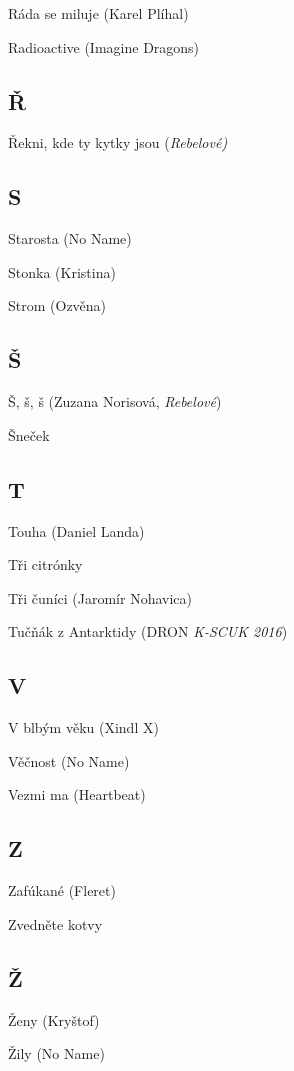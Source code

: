 \begin{multicols}{2}
Ráda se miluje (Karel Plíhal)

Radioactive (Imagine Dragons)

\subsection*{Ř}
Řekni, kde ty kytky jsou (\emph{Rebelové)}

\subsection*{S}
Starosta (No Name)

Stonka (Kristina)

Strom (Ozvěna)

\subsection*{Š}
Š, š, š (Zuzana Norisová, \emph{Rebelové})

Šneček

\subsection*{T}
Touha (Daniel Landa)

Tři citrónky

Tři čuníci (Jaromír Nohavica)

Tučňák z Antarktidy (DRON \emph{K-SCUK 2016})

\subsection*{V}
V blbým věku (Xindl X)

Věčnost (No Name)

Vezmi ma (Heartbeat)

\subsection*{Z}
Zafúkané (Fleret)

Zvedněte kotvy

\subsection*{Ž}
Ženy (Kryštof)

Žily (No Name)

\end{multicols}

\newpage
